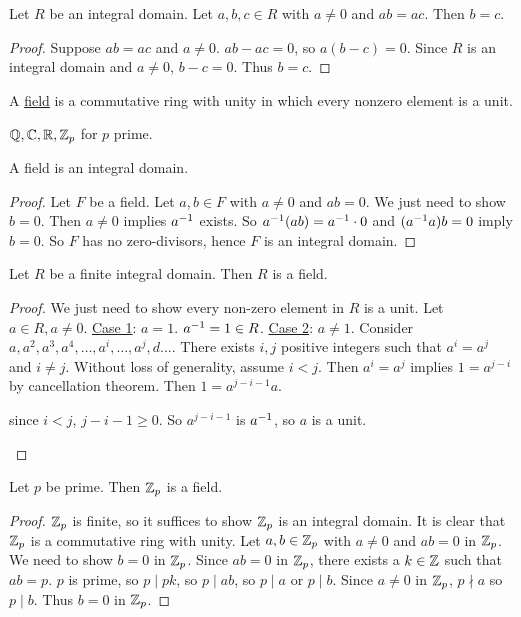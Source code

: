 \documentclass[]{article}
\begin{document}
\begin{theorem}
	Let $R$ be an integral domain. Let $a,b,c\in R$ with $a\neq0$ and $ab=ac$. Then $b=c$.
\end{theorem}
\begin{proof}
	Suppose $ab=ac$ and $a\neq0$. $ab-ac=0$, so $a(b-c)=0$.
	Since $R$ is an integral domain and $a\neq0$, $b-c=0$. Thus $b=c$.
\end{proof}
\begin{definition}
	A \ul{field} is a commutative ring with unity in which every nonzero element is a unit.
\end{definition}
\begin{example}
	$\mathbb{Q},\mathbb{C},\mathbb{R},\mathbb{Z}_p$ for $p$ prime.
\end{example}
\begin{remark}
	A field is an integral domain.
\end{remark}
\begin{proof}
	Let $F$ be a field. Let $a,b\in F$ with $a\neq0$ and $ab=0$.
	We just need to show $b=0$. Then $a\neq0$ implies $a^{-1}$ exists. So $a^{-1}(ab)=a^{-1}\cdot 0$ and $(a^{-1} a)b=0$ imply $b=0$.
	So $F$ has no zero-divisors, hence $F$ is an integral domain.
\end{proof}
\begin{theorem}
	Let $R$ be a finite integral domain. Then $R$ is a field.
\end{theorem}
\begin{proof}
	We just need to show every non-zero element in $R$ is a unit.
	Let $a\in R,a\neq0$.
	\ul{Case 1}: $a=1$. $a^{-1}=1\in R$.
	\ul{Case 2}: $a\neq1$. Consider $a,a^2,a^3,a^4,\dots,a^i,\dots,a^j,d\dots$.
	There exists $i,j$ positive integers such that $a^i=a^j$ and $i\neq j$.
	Without loss of generality, assume $i<j$. Then $a^i=a^j$ implies $1=a^{j-i}$ by cancellation theorem.
	Then $1=a^{j-i-1}a$.
	\begin{note}
		since $i<j$, $j-i-1\geq0$. So $a^{j-i-1}$ is $a^{-1}$, so $a$ is a unit.
	\end{note}
\end{proof}
\begin{corollary}
	Let $p$ be prime. Then $\mathbb{Z}_p$ is a field.
\end{corollary}
\begin{proof}
	$\mathbb{Z}_p$ is finite, so it suffices to show $\mathbb{Z}_p$ is an integral domain.
	It is clear that $\mathbb{Z}_p$ is a commutative ring with unity.
	Let $a,b\in\mathbb{Z}_p$ with $a\neq0$ and $ab=0$ in $\mathbb{Z}_p$.
	We need to show $b=0$ in $\mathbb{Z}_p$. Since $ab=0$ in $\mathbb{Z}_p$, there exists a $k\in\mathbb{Z}$ such that $ab=p$.
	$p$ is prime, so $p\mid pk$, so $p\mid ab$, so $p\mid a$ or $p\mid b$.
	Since $a\neq0$ in $\mathbb{Z}_p$, $p\nmid a$ so $p\mid b$. Thus $b=0$ in $\mathbb{Z}_p$.
\end{proof}
\end{document}

